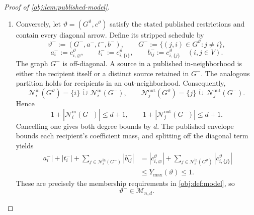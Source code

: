 \documentclass[11pt]{article}
\begin{document}
\begin{proof}[Proof of \cref{obj:lem:published-model}]
\begin{enumerate}
Since \(G\) is off-diagonal,
\[
\mathcal N^{\mathrm{in}}_i(\widetilde G)
=\{i\}\,\dot\cup\,\mathcal N^{\mathrm{in}}_i(G),
\qquad
\mathcal N^{\mathrm{out}}_j(\widetilde G)
=\{j\}\,\dot\cup\,\mathcal N^{\mathrm{out}}_j(G).
\]
Splitting the coefficient sum at the own coordinate therefore gives
\[
|c^{\mathrm{pub}}_{i,\varnothing}|
+\sum_{j\in\mathcal N^{\mathrm{in}}_i(\widetilde G)}
|c^{\mathrm{pub}}_{i,\{j\}}|
=
|a_i|+|t_i|
+\sum_{j\in\mathcal N^{\mathrm{in}}_i(G)}|b_{ij}|.
\]
For \(\theta\in\mathcal M_{n,d}\), the coefficient-mass requirement in
\cref{obj:def:model} bounds each right-hand side by one. Taking the maximum proves
\[
Y_{\max}(\theta^+)\le1.
\]
The same disjoint neighborhood decompositions and the two degree bounds in
\cref{obj:def:model} give
\[
|\mathcal N^{\mathrm{in}}_i(\widetilde G)|
=1+|\mathcal N^{\mathrm{in}}_i(G)|\le d+1,
\qquad
|\mathcal N^{\mathrm{out}}_j(\widetilde G)|
=1+|\mathcal N^{\mathrm{out}}_j(G)|\le d+1.
\]
Every diagonal arrow belongs to \(\widetilde G\) by construction. These identities also cover \(d=0\), with empty off-diagonal neighborhoods and zero neighborhood sums.

\item Conversely, let \(\vartheta=(G^\vartheta,c^\vartheta)\) satisfy the stated published restrictions and contain every diagonal arrow. Define its stripped schedule by
\[
\vartheta^-:=(G^-,a^-,t^-,b^-),
\qquad
G^-:=\{(j,i)\in G^\vartheta:j\ne i\},
\]
\[
a_i^-:=c^\vartheta_{i,\varnothing},
\qquad
t_i^-:=c^\vartheta_{i,\{i\}},
\qquad
b_{ij}^-:=c^\vartheta_{i,\{j\}}
\quad(i,j\in V).
\]
The graph \(G^-\) is off-diagonal. A source in a published in-neighborhood is either the recipient itself or a distinct source retained in \(G^-\). The analogous partition holds for recipients in an out-neighborhood. Consequently,
\[
\mathcal N^{\mathrm{in}}_i(G^\vartheta)
=\{i\}\,\dot\cup\,\mathcal N^{\mathrm{in}}_i(G^-),
\qquad
\mathcal N^{\mathrm{out}}_j(G^\vartheta)
=\{j\}\,\dot\cup\,\mathcal N^{\mathrm{out}}_j(G^-).
\]
Hence
\[
1+|\mathcal N^{\mathrm{in}}_i(G^-)|\le d+1,
\qquad
1+|\mathcal N^{\mathrm{out}}_j(G^-)|\le d+1.
\]
Cancelling one gives both degree bounds by \(d\). The published envelope bounds each recipient's coefficient mass, and splitting off the diagonal term yields
\[
\begin{aligned}
|a_i^-|+|t_i^-|
+\sum_{j\in\mathcal N^{\mathrm{in}}_i(G^-)}|b_{ij}^-|
&=
|c^\vartheta_{i,\varnothing}|
+\sum_{j\in\mathcal N^{\mathrm{in}}_i(G^\vartheta)}
|c^\vartheta_{i,\{j\}}|\\
&\le Y_{\max}(\vartheta)\le1.
\end{aligned}
\]
These are precisely the membership requirements in \cref{obj:def:model}, so
\[
\vartheta^-\in\mathcal M_{n,d}.
\]


\end{enumerate}
\end{proof}
\end{document}
